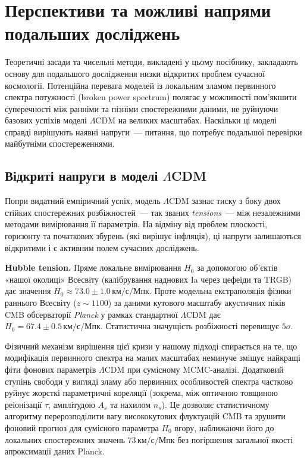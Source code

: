 
\chapter{Перспективи та можливі напрями подальших досліджень}
\label{sec:future_research}

Теоретичні засади та чисельні методи, викладені у цьому посібнику, закладають основу для подальшого дослідження низки відкритих проблем сучасної космології. Потенційна перевага моделей із локальним зламом первинного спектра потужності (broken power spectrum) полягає у можливості пом'якшити суперечності між ранніми та пізніми спостережними даними, не руйнуючи базових успіхів моделі $\Lambda$CDM на великих масштабах. Наскільки ці моделі справді вирішують наявні напруги~--- питання, що потребує подальшої перевірки майбутніми спостереженнями.

\section{Відкриті напруги в моделі $\Lambda$CDM}
\label{sec:tensions}

Попри видатний емпіричний успіх, модель $\Lambda$CDM зазнає тиску з боку двох
стійких спостережних розбіжностей~--- так званих \emph{tensions}~---
між незалежними методами вимірювання її параметрів. На відміну від проблем
плоскості, горизонту та початкових збурень (які вирішує інфляція),
ці напруги залишаються відкритими і є активним полем сучасних досліджень.

\textbf{Hubble tension.}
Пряме локальне вимірювання $H_0$ за допомогою об'єктів «нашої околиці» Всесвіту (калібрування наднових Ia через цефеїди та TRGB) дає значення $H_0 \approx 73.0 \pm 1.0\,\text{км/с/Мпк}$. Проте модельна екстраполяція фізики раннього Всесвіту ($z \sim 1100$) за даними кутового масштабу акустичних піків CMB обсерваторії \emph{Planck} у рамках стандартної $\Lambda$CDM дає $H_0 = 67.4 \pm 0.5\,\text{км/с/Мпк}$. Статистична значущість розбіжності перевищує $5\sigma$.

Фізичний механізм вирішення цієї кризи у нашому підході спирається на те, що модифікація первинного спектра на малих масштабах неминуче зміщує найкращі фіти фонових параметрів $\Lambda$CDM при сумісному MCMC-аналізі. Додатковий ступінь свободи у вигляді зламу або первинних особливостей спектра частково руйнує жорсткі параметричні кореляції (зокрема, між оптичною товщиною реіонізації $\tau$, амплітудою $A_s$ та нахилом $n_s$). Це дозволяє статистичному алгоритму перерозподілити вагу висококутових флуктуацій CMB та зрушити фоновий прогноз для сумісного параметра $H_0$ вгору, наближаючи його до локальних спостережних значень $73\,\text{км/с/Мпк}$ без погіршення загальної якості апроксимації даних Planck.

